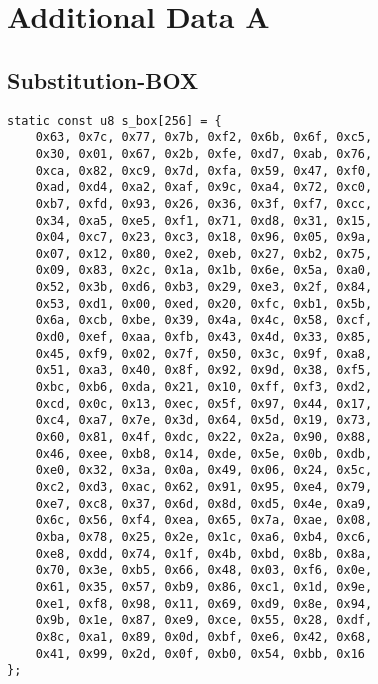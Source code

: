 \chapter{Additional Data A}

\section{Substitution-BOX}
\hypertarget{s-box}{}

\begin{lstlisting}[style=C, caption={},captionpos=t]
static const u8 s_box[256] = {
	0x63, 0x7c, 0x77, 0x7b, 0xf2, 0x6b, 0x6f, 0xc5,
	0x30, 0x01, 0x67, 0x2b, 0xfe, 0xd7, 0xab, 0x76,
	0xca, 0x82, 0xc9, 0x7d, 0xfa, 0x59, 0x47, 0xf0,
	0xad, 0xd4, 0xa2, 0xaf, 0x9c, 0xa4, 0x72, 0xc0,
	0xb7, 0xfd, 0x93, 0x26, 0x36, 0x3f, 0xf7, 0xcc,
	0x34, 0xa5, 0xe5, 0xf1, 0x71, 0xd8, 0x31, 0x15,
	0x04, 0xc7, 0x23, 0xc3, 0x18, 0x96, 0x05, 0x9a,
	0x07, 0x12, 0x80, 0xe2, 0xeb, 0x27, 0xb2, 0x75,
	0x09, 0x83, 0x2c, 0x1a, 0x1b, 0x6e, 0x5a, 0xa0,
	0x52, 0x3b, 0xd6, 0xb3, 0x29, 0xe3, 0x2f, 0x84,
	0x53, 0xd1, 0x00, 0xed, 0x20, 0xfc, 0xb1, 0x5b,
	0x6a, 0xcb, 0xbe, 0x39, 0x4a, 0x4c, 0x58, 0xcf,
	0xd0, 0xef, 0xaa, 0xfb, 0x43, 0x4d, 0x33, 0x85,
	0x45, 0xf9, 0x02, 0x7f, 0x50, 0x3c, 0x9f, 0xa8,
	0x51, 0xa3, 0x40, 0x8f, 0x92, 0x9d, 0x38, 0xf5,
	0xbc, 0xb6, 0xda, 0x21, 0x10, 0xff, 0xf3, 0xd2,
	0xcd, 0x0c, 0x13, 0xec, 0x5f, 0x97, 0x44, 0x17,
	0xc4, 0xa7, 0x7e, 0x3d, 0x64, 0x5d, 0x19, 0x73,
	0x60, 0x81, 0x4f, 0xdc, 0x22, 0x2a, 0x90, 0x88,
	0x46, 0xee, 0xb8, 0x14, 0xde, 0x5e, 0x0b, 0xdb,
	0xe0, 0x32, 0x3a, 0x0a, 0x49, 0x06, 0x24, 0x5c,
	0xc2, 0xd3, 0xac, 0x62, 0x91, 0x95, 0xe4, 0x79,
	0xe7, 0xc8, 0x37, 0x6d, 0x8d, 0xd5, 0x4e, 0xa9,
	0x6c, 0x56, 0xf4, 0xea, 0x65, 0x7a, 0xae, 0x08,
	0xba, 0x78, 0x25, 0x2e, 0x1c, 0xa6, 0xb4, 0xc6,
	0xe8, 0xdd, 0x74, 0x1f, 0x4b, 0xbd, 0x8b, 0x8a,
	0x70, 0x3e, 0xb5, 0x66, 0x48, 0x03, 0xf6, 0x0e,
	0x61, 0x35, 0x57, 0xb9, 0x86, 0xc1, 0x1d, 0x9e,
	0xe1, 0xf8, 0x98, 0x11, 0x69, 0xd9, 0x8e, 0x94,
	0x9b, 0x1e, 0x87, 0xe9, 0xce, 0x55, 0x28, 0xdf,
	0x8c, 0xa1, 0x89, 0x0d, 0xbf, 0xe6, 0x42, 0x68,
	0x41, 0x99, 0x2d, 0x0f, 0xb0, 0x54, 0xbb, 0x16
};
\end{lstlisting}

